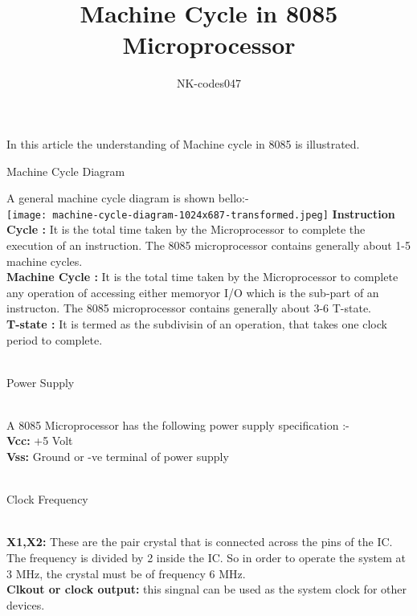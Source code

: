 \documentclass[11pt]{article}
\begin{document}
    \title{Machine Cycle in 8085 Microprocessor}
    \author{NK-codes047}
    \date{}
    \maketitle
    In this article the understanding of Machine cycle in 8085 is illustrated.
    \newline\\
    \begin{huge}
        Machine Cycle Diagram\\
    \end{huge}
    A general machine cycle diagram is shown bello:-\\
    \texttt{[image: machine-cycle-diagram-1024x687-transformed.jpeg]}
    \textbf{Instruction Cycle : }
        It is the total time taken by the Microprocessor to complete the execution of an instruction. The 8085 microprocessor contains generally about 1-5 machine cycles.\\
    \textbf{Machine Cycle : }
        It is the total time taken by the Microprocessor to complete any operation of accessing either memoryor I/O which is the sub-part of an instructon. The 8085 microprocessor contains generally about 3-6 T-state.\\
    \textbf{T-state : }
        It is termed as the subdivisin of an operation, that takes one clock period to complete.\\\\
    \begin{huge}
        Power Supply
    \end{huge}\\
    A 8085 Microprocessor has the following power supply specification :-\\
    \textbf{Vcc: }+5 Volt\\
    \textbf{Vss: }Ground or -ve terminal of power supply\\\\
    \begin{huge}
        Clock Frequency
    \end{huge}\\
    \textbf{X1,X2: }These are the pair crystal that is connected across the pins of the IC.
    The frequency is divided by 2 inside the IC. So in order to operate the system at 3 MHz, the crystal must be of frequency 6 MHz.\\
    \textbf{Clkout or clock output: }this singnal can be used as the system clock for other devices.\\\\
\end{document}
